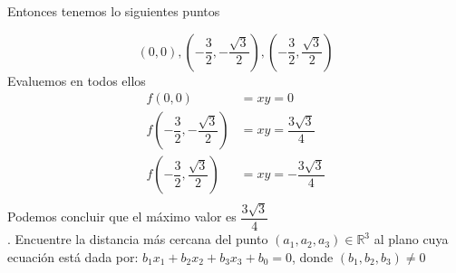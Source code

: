 \documentclass[letterpaper]{article}
\renewcommand{\*}{\cdot}
\theoremstyle{definition}
\begin{document}
Entonces tenemos lo siguientes puntos

\[ (0,0), \left(-\dfrac{3}{2}, - \dfrac{\sqrt{3}}{2}\right), \left(-\dfrac{3}{2},  \dfrac{\sqrt{3}}{2}\right) \]
Evaluemos en todos ellos
\begin{align*}
	f(0,0) &= xy = 0\\ 
	f\left(-\dfrac{3}{2}, - \dfrac{\sqrt{3}}{2}\right) &= xy = \dfrac{3\sqrt{3}}{4}\\ 
	f\left(-\dfrac{3}{2},  \dfrac{\sqrt{3}}{2}\right) &= xy = -\dfrac{3\sqrt{3}}{4}\\ 
\end{align*}
Podemos concluir que el máximo valor es $ \dfrac{3\sqrt{3}}{4} $ \\

. Encuentre la distancia más cercana del punto $(a_1, a_2, a_3) \in \mathbb{R}^3$ al plano cuya ecuación está dada por: $b_1x_1 + b_2x_2 + b_3x_3 + b_0 = 0$, donde $(b_1, b_2, b_3) \neq 0 $\\
\end{document}
